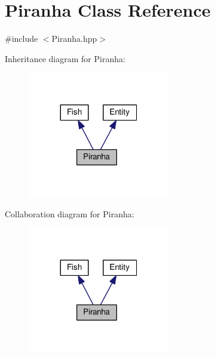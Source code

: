 \hypertarget{classPiranha}{}\section{Piranha Class Reference}
\label{classPiranha}


{\ttfamily \#include $<$Piranha.\+hpp$>$}



Inheritance diagram for Piranha\+:
\nopagebreak
\begin{figure}[H]
\begin{center}
\leavevmode
\includegraphics[width=176pt]{classPiranha__inherit__graph}
\end{center}
\end{figure}


Collaboration diagram for Piranha\+:
\nopagebreak
\begin{figure}[H]
\begin{center}
\leavevmode
\includegraphics[width=176pt]{classPiranha__coll__graph}
\end{center}
\end{figure}
